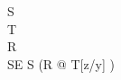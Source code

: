 \begin{zed}
   S 
\\
   T 
\\
   R 
\\
   SE  S \lor (\exists \Delta R @ T[z/y] \land [ a, a': \nat | a = z \land a' = z' ])
\end{zed}
